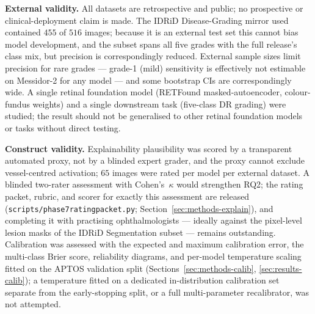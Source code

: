 \documentclass[journal]{IEEEtran}
\renewcommand{\_}{\origunderscore\allowbreak}
\begin{document}
\textbf{External validity.} All datasets are retrospective and public; no
prospective or clinical-deployment claim is made. The IDRiD Disease-Grading mirror
used contained $455$ of $516$ images; because it is an external test set this
cannot bias model development, and the subset spans all five grades with the full
release's class mix, but precision is correspondingly reduced. External sample
sizes limit precision for rare grades --- grade-1 (mild) sensitivity is
effectively not estimable on Messidor-2 for any model --- and some bootstrap CIs
are correspondingly wide. A single retinal foundation model (RETFound
masked-autoencoder, colour-fundus weights) and a single downstream task
(five-class DR grading) were studied; the result should not be generalised to
other retinal foundation models or tasks without direct testing.

\textbf{Construct validity.} Explainability plausibility was scored by a
transparent automated proxy, not by a blinded expert grader, and the proxy cannot
exclude vessel-centred activation; $65$ images were rated per model per external
dataset. A blinded two-rater assessment with Cohen's~$\kappa$ would strengthen
RQ2; the rating packet, rubric, and scorer for exactly this assessment are
released (\texttt{scripts/\allowbreak{}phase7\_rating\_packet.py};
Section~\ref{sec:methods-explain}), and completing it with practising
ophthalmologists --- ideally against the pixel-level lesion masks of the IDRiD
Segmentation subset --- remains outstanding. Calibration was assessed with the expected and maximum calibration error,
the multi-class Brier score, reliability diagrams, and per-model temperature
scaling fitted on the APTOS validation split
(Sections~\ref{sec:methods-calib}, \ref{sec:results-calib}); a temperature fitted
on a dedicated in-distribution calibration set separate from the early-stopping
split, or a full multi-parameter recalibrator, was not attempted.
\end{document}
